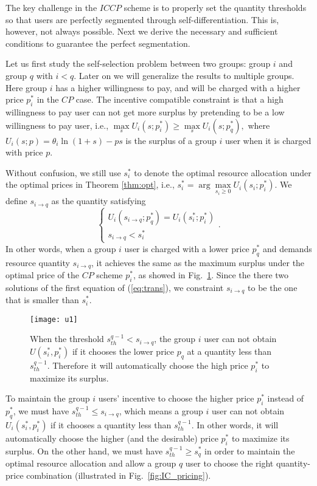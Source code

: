 \documentclass[twocolumn,10pt,twosided]{IEEEtran}
\begin{document}
The key challenge in the $ICCP$ scheme is to properly set the quantity thresholds so
that users are perfectly segmented through self-differentiation.
This is, however, not always possible. Next we derive the necessary
and sufficient conditions to guarantee the perfect segmentation.

Let us first study the self-selection problem between two groups:
group $i$ and group $q$ with $i<q$. Later on we will generalize the
results to multiple groups. Here group $i$ has a higher willingness to pay, and will be charged with a higher price $p_i^\ast$ in the $CP$ case.   The incentive compatible constraint is that a high willingness to pay user can not get more surplus by pretending to be a low willingness to pay user, i.e.,
$\max\limits_{s}U_i(s;p^*_i)\ge \max\limits_{s}U_i(s;p^*_q),$
where $U_i(s;p)=\theta_i\ln(1+s)-ps$ is the surplus of
a group $i$ user when it is charged with price $p$.

Without confusion, we still use $s^*_i$ to denote the optimal resource allocation
under the optimal prices in Theorem \ref{thm:opt}, i.e.,
$s^*_i=\arg\max\limits_{s_i\geq 0}U_i(s_i;p^*_i).$ We define $s_{i\rightarrow q}$ as the quantity satisfying
\begin{equation}
\label{eq:trans}
\left\{\!\!{\begin{array}{ll}
 \!\!  U_i(s_{i\rightarrow q};p^*_q)= U_i(s^*_i;p^*_i)\!\!\\
 \!\!  s_{i\rightarrow q}< s^*_i
\end{array}} \right.
. \end{equation}
In other words, when a group $i$ user is charged with a lower price
$p^*_q$ and demands resource quantity $s_{i\rightarrow q}$, it
achieves the same as the maximum surplus under the optimal price of the $CP$ scheme $p^*_{i}$,
as showed in Fig.~\ref{fig:utility}.  Since the there two solutions of the first equation of (\ref{eq:trans}), we constraint $s_{i\rightarrow q}$ to be the one that is smaller than $s_i^\ast$.
\begin{figure}[ht]
 \centering
\texttt{[image: u1]}
\caption{When the threshold $s^{q-1}_{th}<s_{i\rightarrow q}$, the
group $i$ user can not obtain $U(s_i^*,p^*_i)$ if it chooses the
lower price $p_q$ at a quantity less than $s^{q-1}_{th}$. Therefore
it will automatically choose the high price $p^*_i$ to maximize its
surplus. } \label{fig:utility}
\end{figure}

To maintain the group $i$ users' incentive to choose the higher
price $p^*_i$ instead of $p^*_q$, we must have $s^{q-1}_{th}\le
s_{i\rightarrow q}$, which means a group $i$ user can not obtain
$U_i(s_i^*,p^*_{i})$ if it chooses a quantity less than
$s^{q-1}_{th}$. In other words, it will automatically choose the
higher (and the desirable) price $p^*_i$ to maximize its surplus.
On the other hand, we must have $s_{th}^{q-1} \geq s_q^\ast$ in order to maintain the optimal resource allocation and allow a group $q$ user to choose the right quantity-price combination (illustrated in Fig.~\ref{fig:IC_pricing}).
\end{document}

